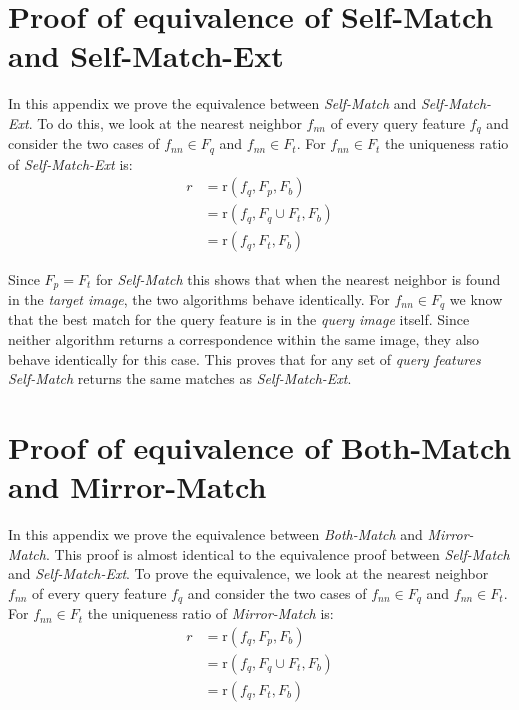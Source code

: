 \documentclass[review]{elsarticle}
\begin{document}
\appendix

\section{Proof of equivalence of Self-Match and Self-Match-Ext}
\label{A:self}

In this appendix we prove the equivalence between \emph{Self-Match} and \emph{Self-Match-Ext}. To do this, we look at the nearest neighbor $f_{nn}$ of every query feature $f_{q}$ and consider the two cases of $f_{nn} \in F_{q}$ and $f_{nn} \in F_{t}$. For $f_{nn} \in F_{t}$ the uniqueness ratio of \emph{Self-Match-Ext} is:
\begin{align*}
    r &= \text{r}(f_{q}, F_{p}, F_{b}) \\
        &= \text{r}(f_{q}, F_{q} \cup F_{t}, F_{b})\\
        &= \text{r}(f_{q}, F_{t}, F_{b})
\end{align*}

Since $F_{p} = F_{t}$ for \emph{Self-Match} this shows that when the nearest neighbor is found in the \emph{target image}, the two algorithms behave identically. For $f_{nn} \in F_{q}$ we know that the best match for the query feature is in the \emph{query image} itself. Since neither algorithm returns a correspondence within the same image, they also behave identically for this case. This proves that for any set of \emph{query features} \emph{Self-Match} returns the same matches as \emph{Self-Match-Ext}.

\section{Proof of equivalence of Both-Match and Mirror-Match}
\label{A:mirror}

In this appendix we prove the equivalence between \emph{Both-Match} and \emph{Mirror-Match}. This proof is almost identical to the equivalence proof between \emph{Self-Match} and \emph{Self-Match-Ext}. To prove the equivalence, we look at the nearest neighbor $f_{nn}$ of every query feature $f_{q}$ and consider the two cases of $f_{nn} \in F_{q}$ and $f_{nn} \in F_{t}$. For $f_{nn} \in F_{t}$ the uniqueness ratio of \emph{Mirror-Match} is:
\begin{align*}
    r &= \text{r}(f_{q}, F_{p}, F_{b}) \\
        &= \text{r}(f_{q}, F_{q} \cup F_{t}, F_{b})\\
        &= \text{r}(f_{q}, F_{t}, F_{b})
\end{align*}
\end{document}
